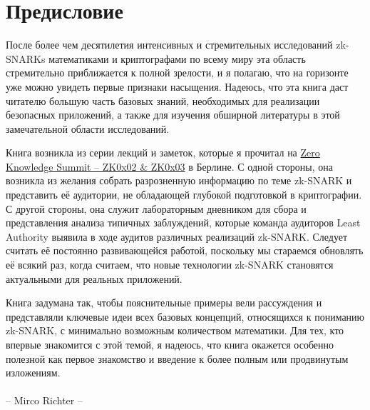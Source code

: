 \chapter*{Предисловие}
После более чем десятилетия интенсивных и стремительных исследований zk-SNARKs математиками
и криптографами по всему миру эта область стремительно приближается к полной зрелости, и я полагаю, что на горизонте уже можно увидеть первые признаки насыщения. Надеюсь, что эта книга даст читателю большую часть базовых знаний, необходимых для реализации безопасных приложений, а также для изучения обширной литературы в этой замечательной области исследований.

Книга возникла из серии лекций и заметок, которые я прочитал на \href{https://www.zksummit.com/}{Zero Knowledge Summit -- ZK0x02 \& ZK0x03} в Берлине. С одной стороны, она возникла из желания собрать разрозненную информацию по теме zk-SNARK и представить её аудитории, не обладающей глубокой подготовкой в криптографии. С другой стороны, она служит лабораторным дневником для сбора и представления анализа типичных заблуждений, которые команда аудиторов Least Authority выявила в ходе аудитов различных реализаций zk-SNARK. Следует считать её постоянно развивающейся работой, поскольку мы стараемся обновлять её всякий раз, когда считаем, что новые технологии zk-SNARK становятся актуальными для реальных приложений.

Книга задумана так, чтобы пояснительные примеры вели рассуждения и представляли ключевые идеи всех базовых концепций, относящихся к пониманию zk-SNARK, с минимально возможным количеством математики. Для тех, кто впервые знакомится с этой темой, я надеюсь, что книга окажется особенно полезной как первое знакомство и введение к более полным или продвинутым изложениям.
\\
\\
\hspace*{0pt}\hfill -- Mirco Richter --
